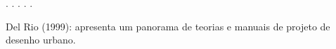 \documentclass[12pt, a4paper]{book} %
\begin{document}

        \begin{center}
            . . . . .
        \end{center} 

        Del Rio (1999): apresenta um panorama de teorias e manuais de projeto de desenho urbano.
\end{document}
